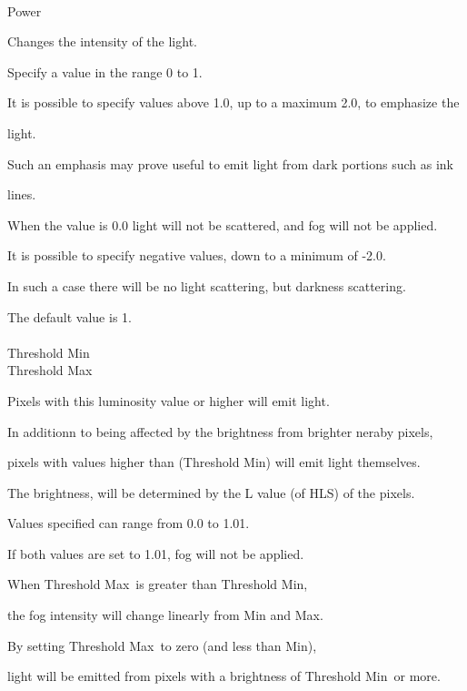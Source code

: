 \documentclass[a4paper,12pt]{article}
\begin{document}
\ \vspace{-0.2em}
\par
\noindent Power\par
Changes the intensity of the light.\par
Specify a value in the range 0 to 1.\par
It is possible to specify values above 1.0, up to a maximum 2.0, to emphasize the\par 
light.\par
Such an emphasis may prove useful to emit light from dark portions such as ink\par 
lines.\par
When the value is 0.0 light will not be scattered, and fog will not be applied.\par
It is possible to specify negative values, down to a minimum of -2.0.\par
In such a case there will be no light scattering, but darkness scattering.\par
The default value is 1.\\
\\
Threshold Min\\
Threshold Max\par
Pixels with this luminosity value or higher will emit light.\\
\par
In additionn to being affected by the brightness from brighter neraby pixels,\par
pixels with values higher than (\textquotedbl Threshold Min\textquotedbl ) will emit light themselves.\par
The brightness, will be determined by the L value (of HLS) of the pixels.\\
\par
Values specified can range from 0.0 to 1.01.\\
\par
If both values are set to 1.01, fog will not be applied.\\
\par
When \textquotedbl Threshold Max\textquotedbl \ is greater than \textquotedbl Threshold Min\textquotedbl ,\par
the fog intensity will change linearly from Min and Max.\\
\par
By setting \textquotedbl Threshold Max\textquotedbl \ to zero (and less than Min),\par
light will be emitted from pixels with a brightness of \textquotedbl Threshold Min\textquotedbl \ or more.\par
\end{document}
